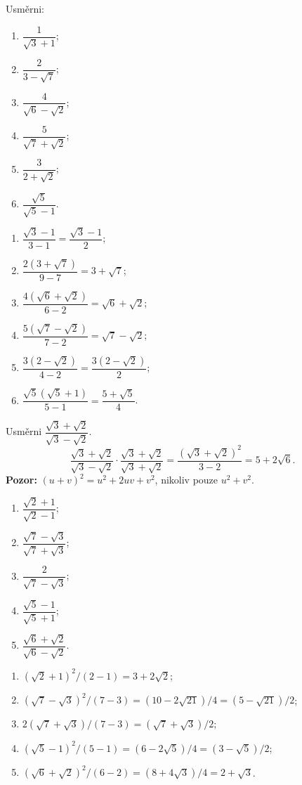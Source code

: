\documentclass[11pt,a4paper]{article}
\begin{document}
\begin{zadaniReseniBox}[breakable=false,title={Samostatná práce 1}]
Usměrni:
\begin{enumerate}[label=\alph*)]
\item $\dfrac1{\sqrt3+1}$;
\item $\dfrac2{3-\sqrt7}$;
\item $\dfrac4{\sqrt6-\sqrt2}$;
\item $\dfrac5{\sqrt7+\sqrt2}$;
\item $\dfrac3{2+\sqrt2}$;
\item $\dfrac{\sqrt5}{\sqrt5-1}$.
\end{enumerate}
\tcblower
\begin{enumerate}[label=\alph*)]
\item $\dfrac{\sqrt3-1}{3-1}=\dfrac{\sqrt3-1}2$;
\item $\dfrac{2(3+\sqrt7)}{9-7}=3+\sqrt7$;
\item $\dfrac{4(\sqrt6+\sqrt2)}{6-2}=\sqrt6+\sqrt2$;
\item $\dfrac{5(\sqrt7-\sqrt2)}{7-2}=\sqrt7-\sqrt2$;
\item $\dfrac{3(2-\sqrt2)}{4-2}=\dfrac{3(2-\sqrt2)}2$;
\item $\dfrac{\sqrt5(\sqrt5+1)}{5-1}=\dfrac{5+\sqrt5}{4}$.
\end{enumerate}
\end{zadaniReseniBox}

\begin{prikladReseniBox}[breakable=false,title={Příklad 2}]
Usměrni $\dfrac{\sqrt3+\sqrt2}{\sqrt3-\sqrt2}$.
\tcblower
\[
\frac{\sqrt3+\sqrt2}{\sqrt3-\sqrt2}
\cdot\frac{\sqrt3+\sqrt2}{\sqrt3+\sqrt2}
=\frac{(\sqrt3+\sqrt2)^2}{3-2}
=\boxed{5+2\sqrt6}.
\]
\textbf{Pozor:} $(u+v)^2=u^2+2uv+v^2$, nikoliv pouze $u^2+v^2$.
\end{prikladReseniBox}

\begin{zadaniReseniBox}[breakable=false,title={Samostatná práce 2}]
\begin{enumerate}[label=\alph*)]
\item $\dfrac{\sqrt2+1}{\sqrt2-1}$;
\item $\dfrac{\sqrt7-\sqrt3}{\sqrt7+\sqrt3}$;
\item $\dfrac2{\sqrt7-\sqrt3}$;
\item $\dfrac{\sqrt5-1}{\sqrt5+1}$;
\item $\dfrac{\sqrt6+\sqrt2}{\sqrt6-\sqrt2}$.
\end{enumerate}
\tcblower
\begin{enumerate}[label=\alph*)]
\item $(\sqrt2+1)^2/(2-1)=3+2\sqrt2$;
\item $(\sqrt7-\sqrt3)^2/(7-3)=(10-2\sqrt{21})/4=(5-\sqrt{21})/2$;
\item $2(\sqrt7+\sqrt3)/(7-3)=(\sqrt7+\sqrt3)/2$;
\item $(\sqrt5-1)^2/(5-1)=(6-2\sqrt5)/4=(3-\sqrt5)/2$;
\item $(\sqrt6+\sqrt2)^2/(6-2)=(8+4\sqrt3)/4=2+\sqrt3$.
\end{enumerate}
\end{zadaniReseniBox}
\end{document}
